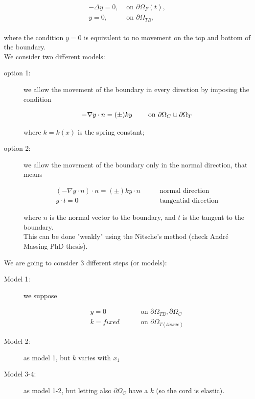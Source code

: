 \documentclass[11pt,a4paper,titlepage]{report}
\begin{document}
\[
\begin{aligned}
- \Delta y = 0, & \text{ on } \partial \Omega_F (t), \\
y = 0, & \text{ on } \partial \Omega_{TB}, \\
\end{aligned}
\]

where the condition $y = 0$ is equivalent to no movement on the top and bottom of the boundary. \\
We consider two different models:

\begin{description}
\item[option 1:] we allow the movement of the boundary in every direction by imposing the condition

\[
- \nabla y \cdot n = (\pm)ky \qquad \text{ on } \partial \Omega_C \cup \partial \Omega_T \\
\]

where $k = k(x)$ is the spring constant;

\item[option 2:] we allow the movement of the boundary only in the normal direction, that means

\[
\begin{aligned}
(- \nabla y \cdot n) \cdot n = (\pm)ky \cdot n & \qquad \text{normal direction} \\
y \cdot t = 0 & \qquad \text{tangential direction}
\end{aligned}
\]

where $n$ is the normal vector to the boundary, and $t$ is the tangent to the boundary. \\
This can be done "weakly" using the Nitsche's method (check André Massing PhD thesis).

\end{description}

We are going to consider 3 different steps (or models):

\begin{description}
\item[Model 1:] we suppose

\[
\begin{aligned}
y = 0 & \qquad \text{ on } \partial \Omega_{TB}, \partial \Omega_C \\
k = fixed & \qquad \text{ on } \partial \Omega_{T (tissue)}
\end{aligned}
\]

\item[Model 2:] as model 1, but $k$ varies with $x_1$
\item[Model 3-4:] as model 1-2, but letting also $\partial \Omega_C$ have a $k$ (so the cord is elastic).

\end{description}
\end{document}
